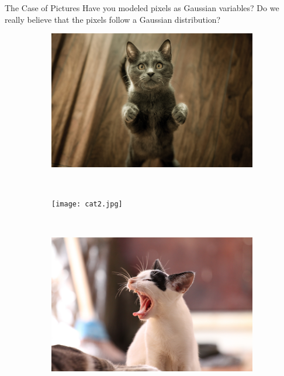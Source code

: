 \documentclass[14pt]{beamer}
\begin{document}
\begin{frame}{The Case of Pictures}
Have you modeled pixels as Gaussian variables?
Do we really believe that the pixels follow a Gaussian distribution?
\begin{figure}
\begin{subfigure}{.3\textwidth}
\includegraphics[scale=.02]{cat1.jpg} 
\end{subfigure}
~
\begin{subfigure}{.3\textwidth}
\texttt{[image: cat2.jpg]} 
\end{subfigure}
~
\begin{subfigure}{.3\textwidth}
\includegraphics[scale=.02]{cat3.jpg} 
\end{subfigure}
\end{figure}
\end{frame}
\end{document}
